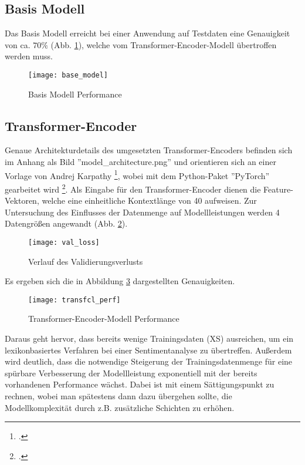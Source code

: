 \subsection*{Basis Modell}\label{sec:base_model}

Das Basis Modell erreicht bei einer Anwendung auf Testdaten eine Genauigkeit von ca. $70\%$ (Abb. \ref{fig:base_model}), welche vom Transformer-Encoder-Modell übertroffen werden muss.

\begin{figure}[H]
	\centering
	\texttt{[image: base\_model]}
	\caption{Basis Modell Performance}
	\label{fig:base_model}
	\raggedright
	\vspace{-1.0em}
\end{figure} 

\subsection*{Transformer-Encoder}\label{sec:transfenc}

Genaue Architekturdetails des umgesetzten Transformer-Encoders befinden sich im Anhang als Bild ''model\_architecture.png'' und orientieren sich an einer Vorlage von Andrej Karpathy \footcite{website:nanoGPT}, wobei mit dem Python-Paket ''PyTorch'' gearbeitet wird \footcite{website:PyTorch}. Als Eingabe für den Transformer-Encoder dienen die Feature-Vektoren, welche eine einheitliche Kontextlänge von 40 aufweisen. Zur Untersuchung des Einflusses der Datenmenge auf Modellleistungen werden 4 Datengrößen angewandt (Abb. \ref{fig:val_loss}).

\begin{figure}[H]
	\centering
	\texttt{[image: val\_loss]}
	\caption{Verlauf des Validierungsverlusts}
	\label{fig:val_loss}
	\raggedright
	\vspace{-1.0em}
\end{figure} 

Es ergeben sich die in Abbildung \ref{fig:transfcl_perf} dargestellten Genauigkeiten.

\begin{figure}[H]
	\centering
	\texttt{[image: transfcl\_perf]}
	\caption{Transformer-Encoder-Modell Performance}
	\label{fig:transfcl_perf}
	\raggedright
	\vspace{-1.0em}
\end{figure} 

Daraus geht hervor, dass bereits wenige Trainingsdaten (XS) ausreichen, um ein lexikonbasiertes Verfahren bei einer Sentimentanalyse zu übertreffen. Außerdem wird deutlich, dass die notwendige Steigerung der Trainingsdatenmenge für eine spürbare Verbesserung der Modellleistung exponentiell mit der bereits vorhandenen Performance wächst. Dabei ist mit einem Sättigungspunkt zu rechnen, wobei man spätestens dann dazu übergehen sollte, die Modellkomplexität durch z.B. zusätzliche Schichten zu erhöhen.

